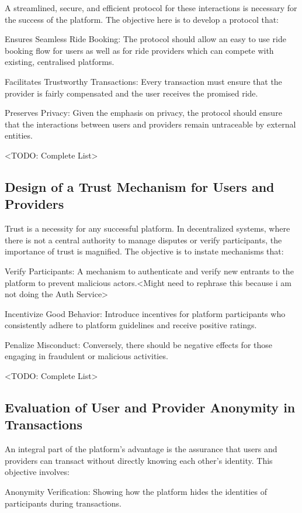 A streamlined, secure, and efficient protocol for these interactions is necessary for the success of the platform. The objective here is to develop a protocol that:

Ensures Seamless Ride Booking: The protocol should allow an easy to use ride booking flow for users as well as for ride providers which can compete with existing, centralised platforms.

Facilitates Trustworthy Transactions: Every transaction must ensure that the provider is fairly compensated and the user receives the promised ride.

Preserves Privacy: Given the emphasis on privacy, the protocol should ensure that the interactions between users and providers remain untraceable by external entities.

<TODO: Complete List>

\subsection{Design of a Trust Mechanism for Users and Providers}

Trust is a necessity for any successful platform. In decentralized systems, where there is not a central authority to manage disputes or verify participants, the importance of trust is magnified. The objective is to instate mechanisms that:

Verify Participants: A mechanism to authenticate and verify new entrants to the platform to prevent malicious actors.<Might need to rephrase this because i am not doing the Auth Service>

Incentivize Good Behavior: Introduce incentives for platform participants who consistently adhere to platform guidelines and receive positive ratings.

Penalize Misconduct: Conversely, there should be negative effects for those engaging in fraudulent or malicious activities.

<TODO: Complete List>

\subsection{Evaluation of User and Provider Anonymity in Transactions}

An integral part of the platform's advantage is the assurance that users and providers can transact without directly knowing each other's identity. This objective involves:

Anonymity Verification: Showing how the platform hides the identities of participants during transactions.

